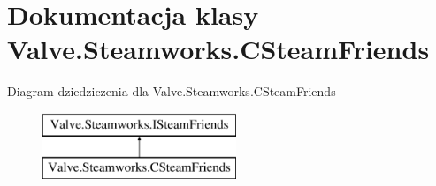 \hypertarget{class_valve_1_1_steamworks_1_1_c_steam_friends}{}\section{Dokumentacja klasy Valve.\+Steamworks.\+C\+Steam\+Friends}
\label{class_valve_1_1_steamworks_1_1_c_steam_friends}
Diagram dziedziczenia dla Valve.\+Steamworks.\+C\+Steam\+Friends\begin{figure}[H]
\begin{center}
\leavevmode
\includegraphics[height=2.000000cm]{class_valve_1_1_steamworks_1_1_c_steam_friends}
\end{center}
\end{figure}
